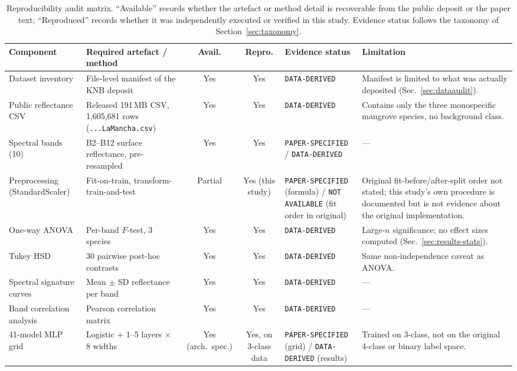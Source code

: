 \documentclass[10pt,twocolumn,a4paper]{article}
\newcommand{\evc}[1]{{\footnotesize\texttt{#1}}}
\begin{document}
\begin{table}[!t]
\centering
\caption{Reproducibility audit matrix. ``Available'' records whether the artefact or method detail
is recoverable from the public deposit or the paper text; ``Reproduced'' records whether it was
independently executed or verified in this study. Evidence status follows the taxonomy of
Section~\ref{sec:taxonomy}.}
\label{tab:audit}
\scriptsize
\setlength{\tabcolsep}{2.6pt}
\begin{tabular}{p{2.55cm} p{3.55cm} c c p{2.15cm} p{5.0cm}}
\toprule
\textbf{Component} & \textbf{Required artefact / method} & \textbf{Avail.} & \textbf{Repro.} & \textbf{Evidence status} & \textbf{Limitation} \\
\midrule
Dataset inventory & File-level manifest of the KNB deposit & Yes & Yes & \evc{DATA-DERIVED} & Manifest is limited to what was actually deposited (Sec.~\ref{sec:dataaudit}). \\
Public reflectance CSV & Released 191\,MB CSV, 1{,}605{,}681 rows (\texttt{...LaMancha.csv}) & Yes & Yes & \evc{DATA-DERIVED} & Contains only the three monospecific mangrove species, no background class. \\
Spectral bands (10) & B2--B12 surface reflectance, pre-resampled & Yes & Yes & \evc{PAPER-SPECIFIED} / \evc{DATA-DERIVED} & --- \\
Preprocessing (StandardScaler) & Fit-on-train, transform-train-and-test & Partial & Yes (this study) & \evc{PAPER-SPECIFIED} (formula) / \evc{NOT AVAILABLE} (fit order in original) & Original fit-before/after-split order not stated; this study's own procedure is documented but is not evidence about the original implementation. \\
One-way ANOVA & Per-band $F$-test, 3 species & Yes & Yes & \evc{DATA-DERIVED} & Large-$n$ significance; no effect sizes computed (Sec.~\ref{sec:results-stats}). \\
Tukey HSD & 30 pairwise post-hoc contrasts & Yes & Yes & \evc{DATA-DERIVED} & Same non-independence caveat as ANOVA. \\
Spectral signature curves & Mean $\pm$ SD reflectance per band & Yes & Yes & \evc{DATA-DERIVED} & --- \\
Band correlation analysis & Pearson correlation matrix & Yes & Yes & \evc{DATA-DERIVED} & --- \\
41-model MLP grid & Logistic $+$ 1--5 layers $\times$ 8 widths & Yes (arch.\ spec.) & Yes, on 3-class data & \evc{PAPER-SPECIFIED} (grid) / \evc{DATA-DERIVED} (results) & Trained on 3-class, not on the original 4-class or binary label space. \\

\end{tabular}
\end{table}
\end{document}
